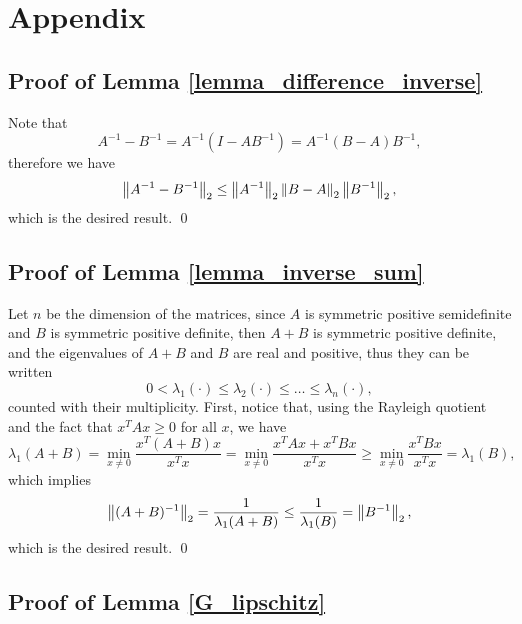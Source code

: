 \section*{Appendix}

\subsection*{Proof of Lemma \ref{lemma_difference_inverse}}

Note that
\[ A^{-1} - B^{-1} = A^{-1} (I - A B^{-1}) = A^{-1} (B - A) B^{-1}, \]
therefore we have
\[ \left\|A^{-1} - B^{-1}\right\|_2 \le \left\|A^{-1}\right\|_2 \left\|B - A\right\|_2 \left\|B^{-1}\right\|_2, \]
which is the desired result.
\qed

\subsection*{Proof of Lemma \ref{lemma_inverse_sum}}

Let $n$ be the dimension of the matrices, since $A$ is symmetric positive semidefinite and $B$ is symmetric positive definite, then $A + B$ is symmetric positive definite, and the eigenvalues of $A + B$ and $B$ are real and positive, thus they can be written
\[ 0 < \lambda_1(\cdot) \le \lambda_2(\cdot) \le \dots \le \lambda_n(\cdot), \]
counted with their multiplicity.
First, notice that, using the Rayleigh quotient and the fact that $x^T A x \ge 0$ for all $x$, we have
\[ \lambda_1(A + B) = \min_{x \neq 0} \frac{x^T(A + B)x}{x^T x} = \min_{x \neq 0} \frac{x^T A x + x^T B x}{x^T x} \ge \min_{x \neq 0} \frac{x^T B x}{x^T x} = \lambda_1(B), \]
which implies
\[ \left\|(A + B)^{-1}\right\|_2 = \frac{1}{\lambda_1(A + B)} \le \frac{1}{\lambda_1(B)} = \left\|B^{-1}\right\|_2, \]
which is the desired result.
\qed

\subsection*{Proof of Lemma \ref{G_lipschitz}}

